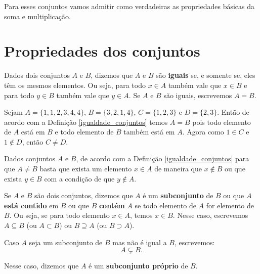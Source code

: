 \begin{observacao}
    Para esses conjuntos vamos admitir como verdadeiras as propriedades b\'asicas da soma e multiplica\c{c}\~ao.
\end{observacao}
\section{Propriedades dos conjuntos}

\begin{definicao}\label{igualdade_conjuntos}
    Dados dois conjuntos $A$ e $B$, dizemos que $A$ e $B$ s{\~a}o \textbf{iguais} se, e somente se, eles t{\^e}m os mesmos elementos. Ou seja, para todo $x \in A$ também vale que $x \in B$ e para todo $y \in B$ também vale que $y \in A$. Se $A$ e $B$ s{\~a}o iguais, escrevemos $A = B$.
\end{definicao}

\begin{exemplo}
    Sejam $A = \{1,1,2,3,4,4\}$, $B = \{3,2,1,4\}$, $C = \{1,2,3\}$ e $D = \{2,3\}$. Ent\~ao de acordo com a Defini\c{c}\~ao
    \ref{igualdade_conjuntos} temos $A = B$ pois todo elemento de $A$ est\'a em $B$ e todo elemento de $B$ tamb\'em est\'a em $A$. Agora
    como $1 \in C$ e $1 \notin D$, ent\~ao $C \ne D$.
\end{exemplo}

\begin{observacao}
    Dados conjuntos $A$ e $B$, de acordo com a Defini\c{c}\~ao \ref{igualdade_conjuntos} para que $A \ne B$ basta que exista um elemento $x \in A$ de maneira que $x \notin B$ ou que exista $y \in B$ com a condição de que $y \notin A$.
\end{observacao}

\begin{definicao}\label{definicao_continencia_conjuntos}
    Se $A$ e $B$ s{\~a}o dois conjuntos, dizemos que $A$ {\'e} um \textbf{subconjunto} de $B$ ou que $A$ \textbf{est\'a contido} em $B$ ou que $B$ \textbf{cont\'em} $A$ se todo elemento de $A$ for elemento de $B$. Ou seja, se para todo elemento $x \in A$, temos $x \in B$. Nesse caso, escrevemos $A \subseteq B$ (ou $A \subset B$) ou $B \supseteq A$ (ou $B \supset A$).
\end{definicao}


Caso $A$ seja um subconjunto de $B$ mas n{\~a}o {\'e} igual a $B$, escrevemos:
\[
    A \subsetneq B.
\]

Nesse caso, dizemos que $A$ {\'e} um \textbf{subconjunto pr{\'o}prio} de $B$.

